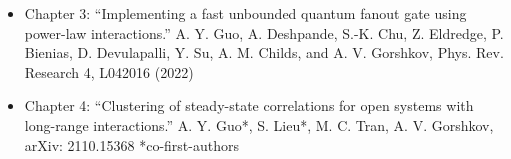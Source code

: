 \begin{itemize}
    \item Chapter 3: ``Implementing a fast unbounded quantum fanout gate using power-law interactions.'' A. Y. Guo, A. Deshpande, S.-K. Chu, Z. Eldredge, P. Bienias, D. Devulapalli, Y. Su, A. M. Childs, and A. V. Gorshkov, Phys. Rev. Research 4, L042016 (2022)

    \item Chapter 4: ``Clustering of steady-state correlations for open systems with long-range interactions.'' A. Y. Guo*, S. Lieu*, M. C. Tran, A. V. Gorshkov, arXiv: 2110.15368 *co-first-authors
\end{itemize}
%
%
%
%
%
